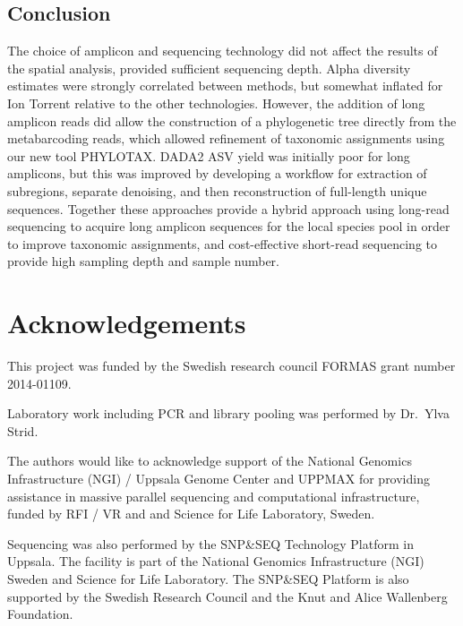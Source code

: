 \documentclass[
  12pt,
]{article}
\begin{document}
\hypertarget{conclusion}{%
\subsection{Conclusion}\label{conclusion}}

The choice of amplicon and sequencing technology did not affect the results of the spatial analysis, provided sufficient sequencing depth.
Alpha diversity estimates were strongly correlated between methods, but somewhat inflated for Ion Torrent relative to the other technologies.
However, the addition of long amplicon reads did allow the construction of a phylogenetic tree directly from the metabarcoding reads, which allowed refinement of taxonomic assignments using our new tool PHYLOTAX.
DADA2 ASV yield was initially poor for long amplicons, but this was improved by developing a workflow for extraction of subregions, separate denoising, and then reconstruction of full-length unique sequences.
Together these approaches provide a hybrid approach using long-read sequencing to acquire long amplicon sequences for the local species pool in order to improve taxonomic assignments, and cost-effective short-read sequencing to provide high sampling depth and sample number.

\hypertarget{acknowledgements}{%
\section*{Acknowledgements}\label{acknowledgements}}

This project was funded by the Swedish research council FORMAS grant number 2014-01109.

Laboratory work including PCR and library pooling was performed by Dr.~Ylva Strid.

The authors would like to acknowledge support of the National Genomics Infrastructure (NGI) / Uppsala Genome Center and UPPMAX for providing assistance in massive parallel sequencing and computational infrastructure, funded by RFI / VR and and Science for Life Laboratory, Sweden.

Sequencing was also performed by the SNP\&SEQ Technology Platform in Uppsala.
The facility is part of the National Genomics Infrastructure (NGI) Sweden and Science for Life Laboratory.
The SNP\&SEQ Platform is also supported by the Swedish Research Council and the Knut and Alice Wallenberg Foundation.

\singlespacing
\end{document}
